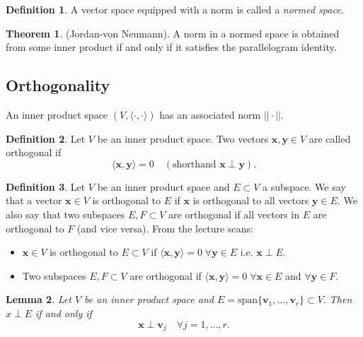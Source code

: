 \documentclass[12pt, a4paper]{article}
\newcommand{\mb}[1]{\mathbf{#1}}
\theoremstyle{definition}
\newtheorem{definition}{Definition}[section]
\newtheorem{theorem}{Theorem}[section]
\theoremstyle{plain}
\newtheorem{lemma}[theorem]{Lemma}
\begin{document}
\begin{definition}
A vector space equipped with a norm is called a \textit{normed space.}
\end{definition}

\begin{theorem}
(Jordan-von Neumann). A norm in a normed space is obtained from some inner product if and only if it satisfies the parallelogram identity.
\end{theorem}

\subsection{Orthogonality}

An inner product space $(V,\langle \cdot,\cdot \rangle)$ has an associated norm $||\cdot||.$

\begin{definition}
Let $V$ be an inner product space. Two vectors $\mathbf{x},\mathbf{y} \in V$ are called orthogonal if $$\langle \mathbf{x,y} \rangle=0  \quad (\text{shorthand } \mathbf{x} \perp \mathbf{y}).$$
\end{definition}

\begin{definition}
Let $V$ be an inner product space and $E \subset V$ a subspace. We say that a vector $\mathbf{x} \in V$ is orthogonal to $E$ if $\mathbf{x}$ is orthogonal to all vectors $\mathbf{y} \in E.$ We also say that two subspaces $E, F \subset V$ are orthogonal if all vectors in $E$ are orthogonal to $F$ (and vice versa).
From the lecture scans: \begin{itemize}

    \item $\mb{x} \in V$ is orthogonal to $E \subset V$ if $\langle \mb{x,y} \rangle=0 \; \forall\mb{y}\in E$ i.e. $\mb{x} \perp E.$ 

    \item Two subspaces $E,F \subset V$ are orthogonal if $\langle \mb{x,y} \rangle=0 \; \forall \mb{x} \in E$ and $\forall\mb{y}\in F.$
\end{itemize}
\end{definition}

\begin{lemma}
Let $V$ be an inner product space and $E = \text{span
}\{\mathbf{v}_1,\ldots,\mathbf{v}_r\} \subset V.$ Then $x \perp E$ if and only if $$\mathbf{x} \perp \mathbf{v}_j \quad \forall j =1,\ldots,r.$$
\end{lemma}
\end{document}
